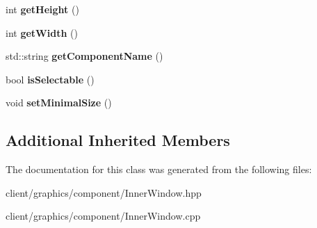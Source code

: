 \begin{DoxyCompactItemize}
\item 
\hypertarget{classgraphics_1_1_inner_window_ae044d37113b21a2bd67f83f9befc1eb9}{int {\bfseries get\-Height} ()}\label{classgraphics_1_1_inner_window_ae044d37113b21a2bd67f83f9befc1eb9}

\item 
\hypertarget{classgraphics_1_1_inner_window_aee462ba96ada52d724cacda9b19f1fc3}{int {\bfseries get\-Width} ()}\label{classgraphics_1_1_inner_window_aee462ba96ada52d724cacda9b19f1fc3}

\item 
\hypertarget{classgraphics_1_1_inner_window_a0c94baeb4b8ca25236e9e826b96b42b4}{std\-::string {\bfseries get\-Component\-Name} ()}\label{classgraphics_1_1_inner_window_a0c94baeb4b8ca25236e9e826b96b42b4}

\item 
\hypertarget{classgraphics_1_1_inner_window_acc18a175d92c7b21f10aeb17934a65a0}{bool {\bfseries is\-Selectable} ()}\label{classgraphics_1_1_inner_window_acc18a175d92c7b21f10aeb17934a65a0}

\item 
\hypertarget{classgraphics_1_1_inner_window_a10e3965b9c9e57de9148ae0c2f743ba6}{void {\bfseries set\-Minimal\-Size} ()}\label{classgraphics_1_1_inner_window_a10e3965b9c9e57de9148ae0c2f743ba6}

\end{DoxyCompactItemize}
\subsection*{Additional Inherited Members}


The documentation for this class was generated from the following files\-:\begin{DoxyCompactItemize}
\item 
client/graphics/component/Inner\-Window.\-hpp\item 
client/graphics/component/Inner\-Window.\-cpp\end{DoxyCompactItemize}
